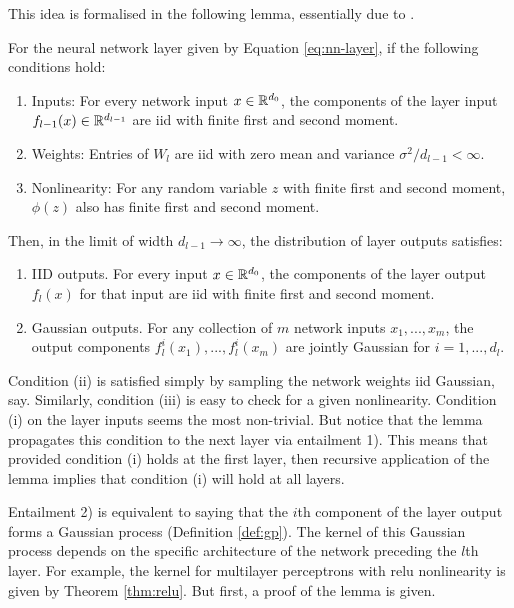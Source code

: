 \begin{refsection}
This idea is formalised in the following lemma, essentially due to \citet{radford}.

\begin{lemma}\label{lem:nngp}

For the neural network layer given by Equation \ref{eq:nn-layer}, if the following conditions hold:
\begin{enumerate}[label=(\roman*)]
    \item Inputs: For every network input $x \in \mathbb{R}^{d_0}$, the components of the layer input $f_{l-1}(x)\in\mathbb{R}^{d_{l-1}}$ are iid with finite first and second moment.
    \item Weights: Entries of $W_l$ are iid with zero mean and variance $\sigma^2/d_{l-1}<\infty$.
    \item Nonlinearity: For any random variable $z$ with finite first and second moment, $\phi(z)$ also has finite first and second moment.
\end{enumerate}
Then, in the limit of width $d_{l-1}\rightarrow\infty$, the distribution of layer outputs satisfies:
\begin{enumerate}
    \item IID outputs. For every input $x \in \mathbb{R}^{d_0}$, the components of the layer output $f_l(x)$ for that input are iid with finite first and second moment.
    \item Gaussian outputs. For any collection of $m$ network inputs $x_1, ..., x_m$, the output components $f_l^i(x_1),...,f_l^i(x_m)$ are jointly Gaussian for $i=1,...,d_l$.
\end{enumerate}
\end{lemma}

Condition (ii) is satisfied simply by sampling the network weights iid Gaussian, say. Similarly, condition (iii) is easy to check for a given nonlinearity. Condition (i) on the layer inputs seems the most non-trivial. But notice that the lemma propagates this condition to the next layer via entailment 1). This means that provided condition (i) holds at the first layer, then recursive application of the lemma implies that condition (i) will hold at all layers.

Entailment 2) is equivalent to saying that the $i$th component of the layer output forms a Gaussian process (Definition \ref{def:gp}). The kernel of this Gaussian process depends on the specific architecture of the network preceding the $l$th layer. For example, the kernel for multilayer perceptrons with relu nonlinearity is given by Theorem \ref{thm:relu}. But first, a proof of the lemma is given.


\end{refsection}
